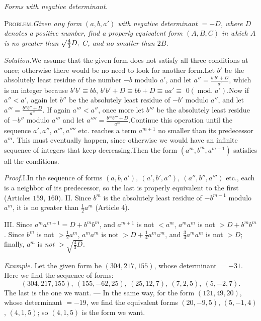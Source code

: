 \begin{center}\emph{Forms with negative determinant.}\end{center}


\textsc{Problem.}\quad \emph{Given any form $(a,b,a')$ with negative determinant $=-D$, where $D$ denotes a positive number, find a properly equivalent form $(A,B,C)$ in which $A$ is no greater than $\surd\tfrac43D,$ $C$, and no smaller than $2B$.}

\emph{Solution.}\quad We assume that the given form does not satisfy all three conditions at once; otherwise there would be no need to look for another form.\quad Let $b'$ be the absolutely least residue of the number $-b$ modulo $a'$, and let $a''=\frac{b'b'+D}{a'}$, which is an integer because $b'b'\equiv bb$, $b'b'+D\equiv bb+D\equiv aa'\equiv$ $0(\operatorname{mod.}a').$\quad Now if $a''<a'$, again let $b''$ be the absolutely least residue of $-b'$ modulo $a''$, and let $a'''=\frac{b''b''+D}{a''}$. If again $a'''<a''$, once more let $b'''$ be the absolutely least residue of $-b''$ modulo $a'''$ and let $a''''=\frac{b'''b'''+D}{a'''}$.\quad Continue this operation until the sequence $a',a''$, $a''',a''''$ etc. reaches a term $a^{m+1}$ no smaller than its predecessor $a^m$. This must eventually happen, since otherwise we would have an infinite sequence of integers that keep decreasing.\quad Then the form $(a^m,b^m,a^{m+1})$ satisfies all the conditions.

\emph{Proof.}\quad I.\quad In the sequence of forms $(a,b,a'),\ (a',b',a''),\ (a'',b'',a''')$ etc., each is a neighbor of its predecessor, so the last is properly equivalent to the first (Articles $159$, $160).$
II. Since $b^m$ is the absolutely least residue of $-b^{m-1}$ modulo $a^m$, it is no greater than $\frac12 a^m$ (Article 4).

III. Since $a^m a^{m+1}=D+b^m b^m$, and $a^{m+1}$ is not $<a^m$, $a^m a^m$ is not $>D+b^m b^m$. Since $b^m$ is not $>\frac12 a^m$, $a^m a^m$ is not $>D+\frac14 a^m a^m$, and $\frac34 a^m a^m$ is not $>D$; finally, $a^m$ is \emph{not} $>\surd{\frac43 D}$.

\emph{Example.} Let the given form be $(304,217,155)$, whose determinant $=-31$. Here we find the sequence of forms:
\[
(304,217,155),\ (155,-62,25),\ (25,12,7),\ (7,2,5),\ (5,-2,7).
\]
The last is the one we want. --- In the same way, for the form $(121,49,20)$, whose determinant $=-19$, we find the equivalent forms $(20,-9,5)$, $(5,-1,4)$, $(4,1,5)$; so $(4,1,5)$ is the form we want.

